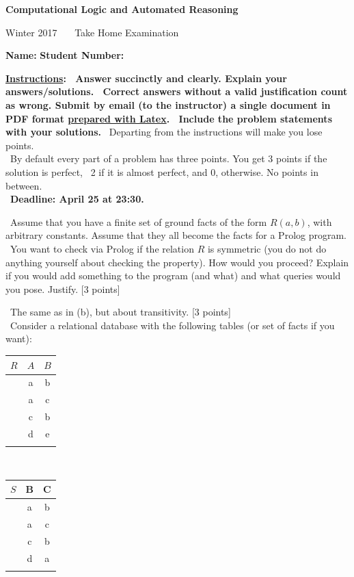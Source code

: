 \documentclass[12pt,fullpage]{article}
\begin{document}
\thispagestyle{empty}
\pagestyle{empty}

\vspace*{-1.5cm}
\begin{center} \bf
\large  Computational Logic and Automated Reasoning

 Winter  2017~~~ Take Home Examination  \ \ \ \ %
\end{center}
{\bf Name:} \hspace{7.5cm} {\bf Student Number:}

\vspace{5mm} \noindent
{\bf \large \underline{Instructions}: \ Answer succinctly and clearly.  Explain your answers/solutions.
\ Correct answers without a valid justification count as wrong. Submit by email (to the instructor) a single document in PDF format \underline{prepared with Latex}. \ Include the problem statements with your solutions.} \ Departing from the instructions will make you lose points. \\
\ By default every part of a problem has three points. You get 3 points if the solution is perfect, \ 2 if it is almost perfect, and $0$, otherwise. No points in between.\\
\ {\bf Deadline: April 25 at 23:30.}

\vspace{2mm}  \ Assume that you have a finite set of ground facts of the form $R(a,b)$, with arbitrary constants. Assume that they all become the facts for a Prolog program. \ You want to check via Prolog
 if the relation $R$ is symmetric (you do not do anything yourself about checking the property). How would you proceed? Explain if you would add something to the program (and what) and what queries would you pose. Justify. \hfill [3 points]

 \ The same as in (b), but about transitivity. \hfill [3 points]\\

 \ Consider a relational database with the following tables (or set of facts if you want):

\begin{center}
\begin{tabular}{c|c|c|} \hline
$R$ & $A$ & $B$ \\ \hline
& a & b \\
& a & c\\
&c & b\\
&d & e\\
\hhline{~--}
\end{tabular}~~~~~\begin{tabular}{c|c|c|} \hline
$S$ & B & C \\ \hline
& a & b \\
& a & c\\
&c & b\\
&d&a\\
\hhline{~--}
\end{tabular}
\end{center}
\end{document}
